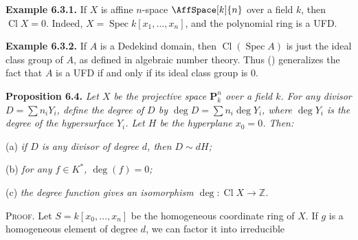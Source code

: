 {\medskip
\noindent\hypertarget{result-II-6.3.1}{}\textbf{Example 6.3.1.} If $X$ is affine $n$-space $\AffSpace[k]{n}$ over a field $k$, then $\operatorname{Cl} X=0$. Indeed, $X=\operatorname{Spec} k[x_1,\ldots,x_n]$, and the polynomial ring is a UFD.

\medskip
\noindent\hypertarget{result-II-6.3.2}{}\textbf{Example 6.3.2.} If $A$ is a Dedekind domain, then $\operatorname{Cl}(\operatorname{Spec} A)$ is just the ideal class group of $A$, as defined in algebraic number theory. Thus () generalizes the fact that $A$ is a UFD if and only if its ideal class group is $0$.

\medskip
\noindent\hypertarget{result-II-6.4}{}\textbf{Proposition 6.4.} \emph{Let $X$ be the projective space $\mathbf P_k^n$ over a field $k$\EditionText{}. For any divisor $D=\sum n_iY_i$, define the degree of $D$ by $\deg D=\sum n_i\deg Y_i$, where $\deg Y_i$ is the degree of the hypersurface $Y_i$. Let $H$ be the hyperplane $x_0=0$. Then:}

\noindent\hspace*{1.7em}\hypertarget{result-II-6.4-a}{}(a) \emph{if $D$ is any divisor of degree $d$, then $D\sim dH$;}

\noindent\hspace*{1.7em}\hypertarget{result-II-6.4-b}{}(b) \emph{for any $f\in K^*$, $\deg(f)=0$;}

\noindent\hspace*{1.7em}\hypertarget{result-II-6.4-c}{}(c) \emph{the degree function gives an isomorphism $\deg\colon\operatorname{Cl} X\to\mathbb Z$.}

\smallskip
\noindent\textsc{Proof.} Let $S=k[x_0,\ldots,x_n]$ be the homogeneous coordinate ring of $X$. If $g$ is a homogeneous element of degree $d$, we can factor it into irreducible}
